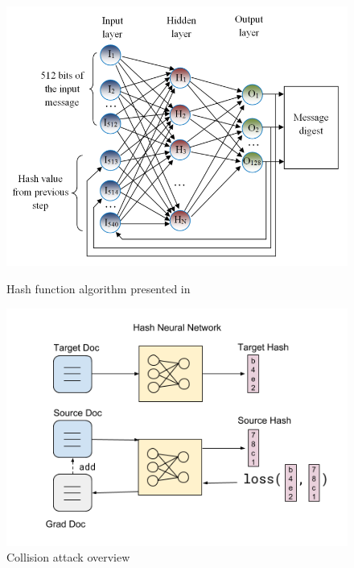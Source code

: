 \documentclass{article}
\begin{document}



\begin{figure}[t]
    \centering
    \begin{minipage}{.5\textwidth}
        \centering
        \includegraphics[width=\textwidth]{hash_nn_architecture}
        \caption{Hash function algorithm presented in \cite{hash1}}
        \label{fig:hashNN}
    \end{minipage}%
    \begin{minipage}{.5\textwidth}
        \centering
        \includegraphics[width=\textwidth]{model_diagram}
        \caption{Collision attack overview} 
        \label{fig:model}
    \end{minipage}
\end{figure}
\end{document}

